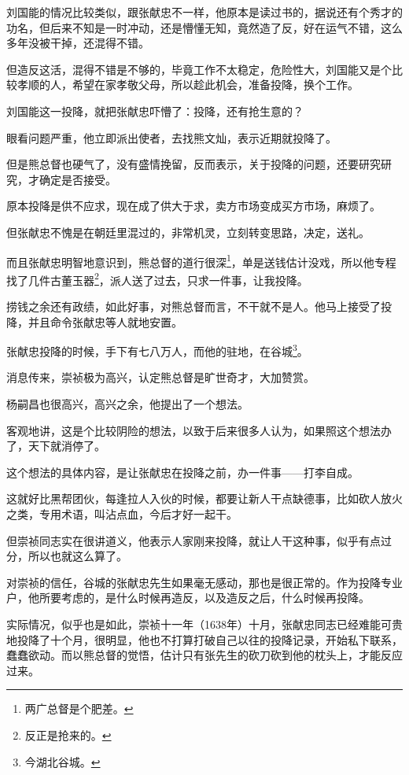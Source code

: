 \begin{multicols}{\theparacolNo}
		刘国能的情况比较类似，跟张献忠不一样，他原本是读过书的，据说还有个秀才的功名，但后来不知是一时冲动，还是懵懂无知，竟然造了反，好在运气不错，这么多年没被干掉，还混得不错。

		但造反这活，混得不错是不够的，毕竟工作不太稳定，危险性大，刘国能又是个比较孝顺的人，希望在家孝敬父母，所以趁此机会，准备投降，换个工作。

		刘国能这一投降，就把张献忠吓懵了：投降，还有抢生意的？

		眼看问题严重，他立即派出使者，去找熊文灿，表示近期就投降了。

		但是熊总督也硬气了，没有盛情挽留，反而表示，关于投降的问题，还要研究研究，才确定是否接受。

		原本投降是供不应求，现在成了供大于求，卖方市场变成买方市场，麻烦了。

		但张献忠不愧是在朝廷里混过的，非常机灵，立刻转变思路，决定，送礼。

		而且张献忠明智地意识到，熊总督的道行很深\footnote{两广总督是个肥差。}，单是送钱估计没戏，所以他专程找了几件古董玉器\footnote{反正是抢来的。}，派人送了过去，只求一件事，让我投降。

		捞钱之余还有政绩，如此好事，对熊总督而言，不干就不是人。他马上接受了投降，并且命令张献忠等人就地安置。

		张献忠投降的时候，手下有七八万人，而他的驻地，在谷城\footnote{今湖北谷城。}。

		消息传来，崇祯极为高兴，认定熊总督是旷世奇才，大加赞赏。

		杨嗣昌也很高兴，高兴之余，他提出了一个想法。

		客观地讲，这是个比较阴险的想法，以致于后来很多人认为，如果照这个想法办了，天下就消停了。

		这个想法的具体内容，是让张献忠在投降之前，办一件事——打李自成。

		这就好比黑帮团伙，每逢拉人入伙的时候，都要让新人干点缺德事，比如砍人放火之类，专用术语，叫沾点血，今后才好一起干。

		但崇祯同志实在很讲道义，他表示人家刚来投降，就让人干这种事，似乎有点过分，所以也就这么算了。

		对崇祯的信任，谷城的张献忠先生如果毫无感动，那也是很正常的。作为投降专业户，他所要考虑的，是什么时候再造反，以及造反之后，什么时候再投降。

		实际情况，似乎也是如此，崇祯十一年（1638年）十月，张献忠同志已经难能可贵地投降了十个月，很明显，他也不打算打破自己以往的投降记录，开始私下联系，蠢蠢欲动。而以熊总督的觉悟，估计只有张先生的砍刀砍到他的枕头上，才能反应过来。


\end{multicols}
